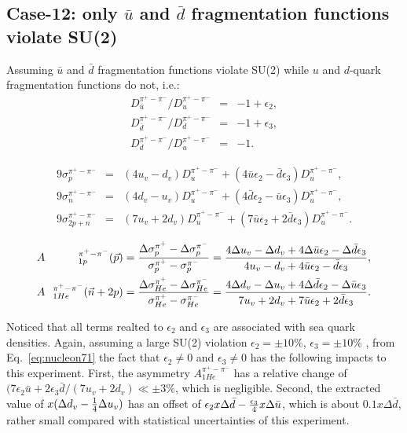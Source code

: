 \subsection{Case-12: only $\bar{u}$ and $\bar{d}$  fragmentation  functions violate SU(2)}
Assuming $\bar{u}$ and $\bar{d}$ fragmentation functions violate SU(2)
while $u$ and $d$-quark fragmentation functions do not, i.e.:
\begin{eqnarray}  
 D_{\bar u}^{\pi^+ -\pi^-}/D_u^{\pi^+ -\pi^-} & = & -1+ \epsilon_2, \nonumber \\ 
 D_{\bar d}^{\pi^+ -\pi^-}/D_d^{\pi^+ -\pi^-} & = & -1 + \epsilon_3, \nonumber \\ 
 D_{d}^{\pi^+ -\pi^-}/D_u^{\pi^+ -\pi^-} & = & -1.
\label{eq:nucleon6}  
\end{eqnarray}  

\begin{eqnarray}  
 9 \sigma_p^{\pi^+ -\pi^-} & = & (4 u_v - d_v) D_u^{\pi^+ -\pi^-} + ( 4 \bar{u} \epsilon_2 - \bar{d} \epsilon_3) D_u^{\pi^+ -\pi^-}, \nonumber \\ 
 9 \sigma_n^{\pi^+ -\pi^-} & = & (4 d_v -u_v) D_u^{\pi^+ -\pi^-} + ( 4 \bar{d} \epsilon_2 - \bar{u} \epsilon_3) D_u^{\pi^+ -\pi^-}, \nonumber \\ 
 9 \sigma_{2p+n}^{\pi^+ -\pi^-} & = & (7u_v + 2 d_v) D_u^{\pi^+ -\pi^-} + (7 \bar{u} \epsilon_2 + 2 \bar{d} \epsilon_3) D_u^{\pi^+ -\pi^-}.
\label{eq:nucleon7}  
\end{eqnarray}  

\begin{eqnarray}
\label{eq:cllo}
&A&\hspace{-0.1cm}_{1p}^{\pi^+ - \pi^-}({\vec p})  =  { \Delta \sigma_p^{\pi^+}-\Delta \sigma_p^{\pi^-} \over
\sigma_p^{\pi^+} - \sigma_p^{\pi^-} }=
{  4\Delta u_v - \Delta d_v + 4 \Delta \bar{u} \epsilon_2 - \Delta \bar{d} \epsilon_3
\over 4u_v - d_v + 4 \bar{u} \epsilon_2 - \bar{d} \epsilon_3}, \\
&A&\hspace{-0.1cm}_{1He}^{\pi^+ - \pi^-} ({\vec n}+2p) =  { \Delta \sigma_{He}^{\pi^+}-\Delta \sigma_{He}^{\pi^-} \over
\sigma_{He}^{\pi^+}- \sigma_{He}^{\pi^-} }=
{ 4\Delta d_v - \Delta u_v + 4 \Delta \bar{d} \epsilon_2 - \Delta \bar{u} \epsilon_3
\over 7 u_v + 2 d_v + 7 \bar{u} \epsilon_2 + 2 \bar{d} \epsilon_3}. 
\label{eq:nucleon71}  
\end{eqnarray}

 Noticed that all terms realted to $\epsilon_2$ and $\epsilon_3$ are associated with sea quark densities.
 Again, assuming a large SU(2) violation  $\epsilon_2= \pm 10 \%$, $\epsilon_3= \pm 10 \%$ , from Eq.~\ref{eq:nucleon71} the fact that $\epsilon_2 \ne 0$ and $\epsilon_3 \ne 0$
has the following impacts to this experiment. First, the asymmetry $A_{1He}^{\pi^+ - \pi^-}$ has a relative change
of $(7 \epsilon_2 \bar{u} + 2 \epsilon_3 \bar{d} / (7 u_v + 2 d_v) \ll  \pm 3 \%$, which is negligible. Second, 
the extracted value of $x(\Delta d_v -{1 \over 4} \Delta u_v)$ has an offset of $\epsilon_2 x \Delta \bar{d}- {\epsilon_3 \over 4}  x \Delta \bar{u}$, 
which is about $0.1 x \Delta  \bar{d}$, rather small compared with statistical uncertainties of this experiment.  

